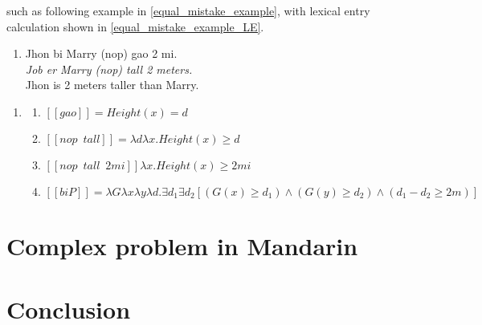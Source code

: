 \documentclass{ctexart}
\begin{document}
such as following example in \ref{equal_mistake_example}, with lexical entry calculation shown in \ref{equal_mistake_example_LE}.

\begin{enumerate}[resume]
    \item \label{equal_mistake_example}
    Jhon bi Marry (nop) gao 2 mi. \\
    \textit{Job er Marry (nop) tall 2 meters.}    \\
    Jhon is 2 meters taller than Marry.
\end{enumerate}

\begin{enumerate}[resume]
    \item \label{equal_mistake_example_LE}
    \begin{enumerate}[ref=(\arabic{enumi}\alph*)]
        \item $[\![gao]\!]=Height(x)=d$
        \item $[\![nop \enspace tall]\!] = \lambda d \lambda x.Height(x) \geq d$
        \item $[\![nop \enspace tall \enspace 2mi]\!] \lambda x.Height(x) \geq 2mi$ 
        \item $[\![biP]\!]=\lambda G \lambda x \lambda y \lambda d. \exists d_1 \exists d_2 [(G(x) \geq d_1) \land (G(y) \geq d_2) \land (d_1-d_2 \geq 2m) ]$
    \end{enumerate}
\end{enumerate} 

\section{Complex problem in Mandarin}


\section{Conclusion}

\newpage

\printbibliography
\end{document}
